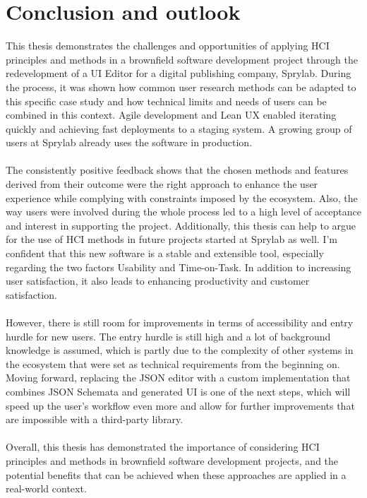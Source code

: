 %
\chapter{Conclusion and outlook}
\label{chap:conclusion}      
This thesis demonstrates the challenges and opportunities of applying HCI principles and methods in a brownfield software development project through the redevelopment of a UI Editor for a digital publishing company, Sprylab.
During the process, it was shown how common user research methods can be adapted to this specific case study and how technical limits and needs of users can be combined in this context.
Agile development and Lean UX enabled iterating quickly and achieving fast deployments to a staging system.
A growing group of users at Sprylab already uses the software in production.
\\\\
The consistently positive feedback shows that the chosen methods and features derived from their outcome were the right approach to enhance the user experience while complying with constraints imposed by the ecosystem.
Also, the way users were involved during the whole process led to a high level of acceptance and interest in supporting the project.
Additionally, this thesis can help to argue for the use of HCI methods in future projects started at Sprylab as well.
I'm confident that this new software is a stable and extensible tool, especially regarding the two factors Usability and Time-on-Task.
In addition to increasing user satisfaction, it also leads to enhancing productivity and customer satisfaction.
\\\\
However, there is still room for improvements in terms of accessibility and entry hurdle for new users.
The entry hurdle is still high and a lot of background knowledge is assumed, which is partly due to the complexity of other systems in the ecosystem that were set as technical requirements from the beginning on.
Moving forward, replacing the JSON editor with a custom implementation that combines JSON Schemata and generated UI is one of the next steps, which will speed up the user's
workflow even more and allow for further improvements that are impossible with a third-party library.
\\\\
Overall, this thesis has demonstrated the importance of considering HCI principles and methods in brownfield software development projects, and the potential benefits that can be achieved when these approaches are applied in a real-world context.